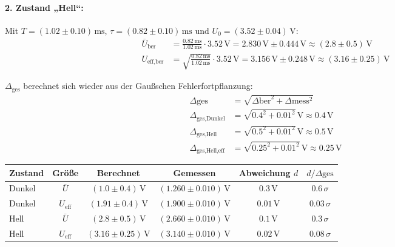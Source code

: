 \documentclass[12pt,a4paper,titlepage]{scrartcl}
\numberwithin{equation}{section}
\numberwithin{table}{section}
\numberwithin{figure}{section}
\begin{document}
\paragraph{2. Zustand „Hell“:}
Mit $T = (1.02 \pm 0.10)\,\text{ms}$, $\tau = (0.82 \pm 0.10)\,\text{ms}$ und $U_0 = (3.52 \pm 0.04)\,\text{V}$:
\begin{align}
    \overline{U}_{\text{ber}} &= \frac{0.82\,\text{ms}}{1.02\,\text{ms}} \cdot 3.52\,\text{V} = 2.830\,\text{V} \pm 0.444\,\text{V} \approx (2.8 \pm 0.5)\,\text{V} \\
    U_{\text{eff,ber}} &= \sqrt{\frac{0.82\,\text{ms}}{1.02\,\text{ms}}} \cdot 3.52\,\text{V} = 3.156\,\text{V} \pm 0.248\,\text{V} \approx (3.16 \pm 0.25)\,\text{V}
\end{align}

$\Delta_\text{ges}$ berechnet sich wieder aus der Gaußschen Fehlerfortpflanzung:
\begin{align}
    \Delta{\text{ges}} &= \sqrt{\Delta{\text{ber}}^2 + \Delta{\text{mess}}^2}\\
    \Delta_{\text{ges,Dunkel}} &= \sqrt{0.4^2 + 0.01^2}\,\text{V} \approx 0.4\,\text{V}\\
    \Delta_{\text{ges,Hell}} &= \sqrt{0.5^2 + 0.01^2}\,\text{V} \approx 0.5\,\text{V}\\
    \Delta_{\text{ges,Hell,eff}} &= \sqrt{0.25^2 + 0.01^2}\,\text{V} \approx 0.25\,\text{V}
\end{align}

\begin{resultbox}[Ergebnis]

        \begin{tabular}{lccccc}
            Zustand & Größe & Berechnet & Gemessen & Abweichung $d$ & $d/\Delta{\text{ges}}$ \\
            \midrule
            Dunkel & $\overline{U}$ & $(1.0 \pm 0.4)\,\text{V}$ & $(1.260 \pm 0.010)\,\text{V}$ & $0.3\,\text{V}$ & $0.6\,\sigma$ \\
            Dunkel & $U_{\text{eff}}$ & $(1.91 \pm 0.4)\,\text{V}$ & $(1.900 \pm 0.010)\,\text{V}$ & $0.01\,\text{V}$ & $0.03\,\sigma$ \\
            \midrule
            Hell & $\overline{U}$ & $(2.8 \pm 0.5)\,\text{V}$ & $(2.660 \pm 0.010)\,\text{V}$ & $0.1\,\text{V}$ & $0.3\,\sigma$ \\
            Hell & $U_{\text{eff}}$ & $(3.16 \pm 0.25)\,\text{V}$ & $(3.140 \pm 0.010)\,\text{V}$ & $0.02\,\text{V}$ & $0.08\,\sigma$ \\
            \bottomrule
        \end{tabular}

\end{resultbox}
\end{document}
